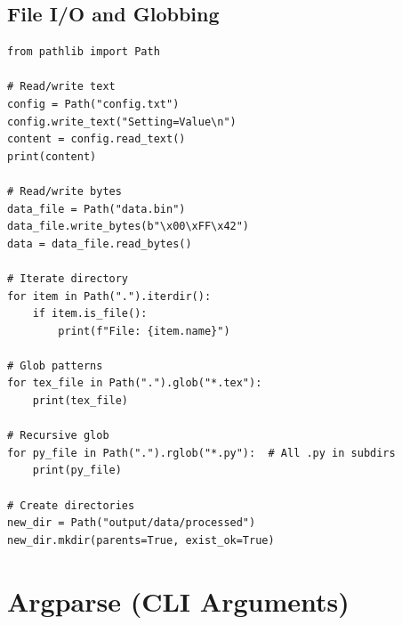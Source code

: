 \subsection{File I/O and Globbing}

\begin{lstlisting}
from pathlib import Path

# Read/write text
config = Path("config.txt")
config.write_text("Setting=Value\n")
content = config.read_text()
print(content)

# Read/write bytes
data_file = Path("data.bin")
data_file.write_bytes(b"\x00\xFF\x42")
data = data_file.read_bytes()

# Iterate directory
for item in Path(".").iterdir():
    if item.is_file():
        print(f"File: {item.name}")

# Glob patterns
for tex_file in Path(".").glob("*.tex"):
    print(tex_file)

# Recursive glob
for py_file in Path(".").rglob("*.py"):  # All .py in subdirs
    print(py_file)

# Create directories
new_dir = Path("output/data/processed")
new_dir.mkdir(parents=True, exist_ok=True)
\end{lstlisting}

\section{Argparse (CLI Arguments)}

